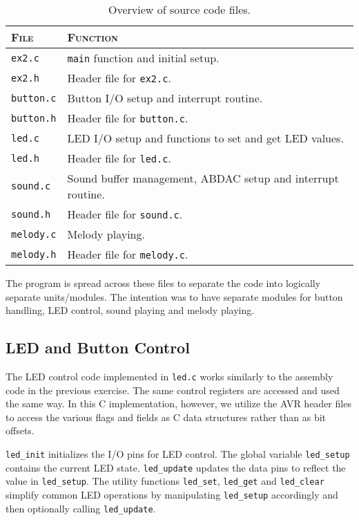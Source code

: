 \begin{table}[H]
\centering
\begin{tabular}{l|l}
\hline
\textsc{File} & \textsc{Function} \\ \hline
\texttt{ex2.c} & \texttt{main} function and initial setup. \\
\texttt{ex2.h} & Header file for \texttt{ex2.c}. \\
\texttt{button.c} & Button I/O setup and interrupt routine. \\
\texttt{button.h} & Header file for \texttt{button.c}. \\
\texttt{led.c} & LED I/O setup and functions to set and get LED values. \\
\texttt{led.h} & Header file for \texttt{led.c}. \\
\texttt{sound.c} & Sound buffer management, ABDAC setup and interrupt
routine. \\
\texttt{sound.h} & Header file for \texttt{sound.c}. \\
\texttt{melody.c} & Melody playing. \\
\texttt{melody.h} & Header file for \texttt{melody.c}. \\
\hline
\end{tabular}
\caption{Overview of source code files.}
\label{tab:sourcefiles}
\end{table}

The program is spread across these files to separate the code into
logically separate units/modules. The intention was to have separate
modules for button handling, LED control, sound playing and melody
playing.

\subsection{LED and Button Control}

The LED control code implemented in \texttt{led.c} works similarly to
the assembly code in the previous exercise. The same control registers
are accessed and used the same way. In this C implementation, however,
we utilize the AVR header files to access the various flags and fields
as C data structures rather than as bit offsets.

\texttt{led\_init} initializes the I/O pins for LED control. The global
variable \texttt{led\_setup} contains the current LED state.
\texttt{led\_update} updates the data pins to reflect the value in
\texttt{led\_setup}. The utility functions \texttt{led\_set},
\texttt{led\_get} and \texttt{led\_clear} simplify common LED operations
by manipulating \texttt{led\_setup} accordingly and then optionally
calling \texttt{led\_update}.

